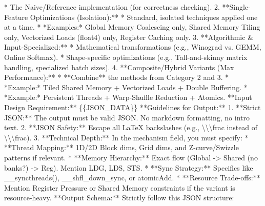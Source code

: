 \documentclass[
  10
]{article}
\newenvironment{Shaded}{}{}
\newcommand{\NormalTok}[1]{#1}
\begin{document}
\begin{Shaded}
\begin{Highlighting}[]
\NormalTok{* The Naive/Reference implementation (for correctness checking).}
\NormalTok{2. **Single{-}Feature Optimizations (Isolation):**}
\NormalTok{    * Standard, isolated techniques applied one at a time.}
\NormalTok{    * *Examples:* \textquotesingle{}Global Memory Coalescing only\textquotesingle{}\textquotesingle{}, \textquotesingle{}Shared Memory Tiling only\textquotesingle{}\textquotesingle{}, \textquotesingle{}Vectorized Loads (float4) only\textquotesingle{}\textquotesingle{}, \textquotesingle{}Register Caching only\textquotesingle{}.}
\NormalTok{3. **Algorithmic \& Input{-}Specialized:**}
\NormalTok{    * Mathematical transformations (e.g., Winograd vs. GEMM, Online Softmax).}
\NormalTok{    * Shape{-}specific optimizations (e.g., \textquotesingle{}Tall{-}and{-}skinny\textquotesingle{} matrix handling, specialized batch sizes).}
\NormalTok{4. **Composite/Hybrid Variants (Max Performance):**}
\NormalTok{    * **Combine** the methods from Category 2 and 3.}
\NormalTok{    * *Example:* \textquotesingle{}Tiled Shared Memory + Vectorized Loads + Double Buffering.\textquotesingle{}}
\NormalTok{    * *Example:* \textquotesingle{}Persistent Threads + Warp{-}Shuffle Reduction + Atomics.\textquotesingle{}}
\NormalTok{**Input Design Requirement:**}
\NormalTok{\{\{JSON\_DATA\}\}}
\NormalTok{**Guidelines for Output:**}
\NormalTok{1. **Strict JSON:** The output must be valid JSON. No markdown formatting, no intro text.}
\NormalTok{2. **JSON Safety:** Escape all LaTeX backslashes (e.g., \textquotesingle{}\textbackslash{}\textbackslash{}\textbackslash{}frac\textquotesingle{} instead of \textquotesingle{}\textbackslash{}\textbackslash{}\textbackslash{}frac\textquotesingle{}). }
\NormalTok{3. **Technical Depth:** In the \textasciigrave{}mechanism\textasciigrave{} field, you must specify:}
\NormalTok{    * **Thread Mapping:** 1D/2D Block dims, Grid dims, and Z{-}curve/Swizzle patterns if relevant.}
\NormalTok{    * **Memory Hierarchy:** Exact flow (Global {-}\textgreater{} Shared (no banks?) {-}\textgreater{} Reg). Mention \textasciigrave{}LDG\textasciigrave{}, \textasciigrave{}LDS\textasciigrave{}, \textasciigrave{}STS\textasciigrave{}. }
\NormalTok{    * **Sync Strategy:** Specifics like \textasciigrave{}\_\_syncthreads()\textasciigrave{}, \textasciigrave{}\_\_shfl\_down\_sync\textasciigrave{}, or \textasciigrave{}atomicAdd\textasciigrave{}. }
\NormalTok{    * **Resource Trade{-}offs:** Mention Register Pressure or Shared Memory constraints if the variant is resource{-}heavy.}
\NormalTok{**Output Schema:**}
\NormalTok{Strictly follow this JSON structure:}


\end{Highlighting}
\end{Shaded}
\end{document}
